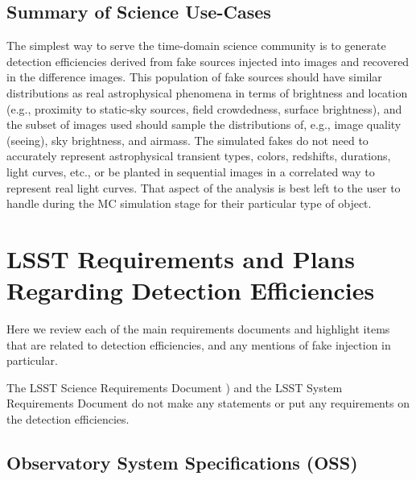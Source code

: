 \documentclass[DM,lsstdraft,toc]{lsstdoc}
\begin{document}
\subsection{Summary of Science Use-Cases}\label{ssec:sci_summary}

The simplest way to serve the time-domain science community is to generate detection efficiencies derived from fake sources injected into images and recovered in the difference images. This population of fake sources should have similar distributions as real astrophysical phenomena in terms of brightness and location (e.g., proximity to static-sky sources, field crowdedness, surface brightness), and the subset of images used should sample the distributions of, e.g., image quality (seeing), sky brightness, and airmass. The simulated fakes do not need to accurately represent astrophysical transient types, colors, redshifts, durations, light curves, etc., or be planted in sequential images in a correlated way to represent real light curves. That aspect of the analysis is best left to the user to handle during the MC simulation stage for their particular type of object. 


\section{LSST Requirements and Plans Regarding Detection Efficiencies}\label{sec:docs}

Here we review each of the main requirements documents and highlight items that are related to detection efficiencies, and any mentions of fake injection in particular.

The LSST Science Requirements Document ) and the LSST System Requirements Document  do not make any statements or put any requirements on the detection efficiencies.

\subsection{Observatory System Specifications (OSS)}\label{ssec:docs_oss}
\end{document}
